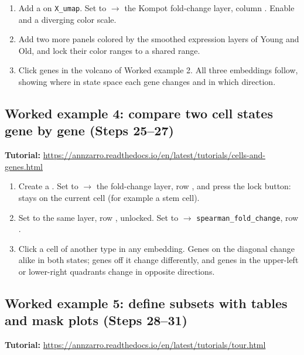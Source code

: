 \begin{enumerate}
\def\labelenumi{\arabic{enumi}.}
\setcounter{enumi}{21}
\tightlist
\item
  Add a  on \texttt{X\_umap}. Set  to  $\rightarrow$ the Kompot fold-change layer, column . Enable  and a diverging color scale.
\troubleshoot{}
\item
  Add two more  panels colored by the smoothed expression layers of Young and Old, and lock their color ranges to a shared range.
\troubleshoot{}
\item
  Click genes in the volcano of Worked example 2. All three embeddings follow, showing where in state space each gene changes and in which direction.
\end{enumerate}

\subsection{Worked example 4: compare two cell states gene by gene (Steps 25--27)}

\noindent\textbf{Tutorial:} \url{https://annzarro.readthedocs.io/en/latest/tutorials/cells-and-genes.html}


\begin{enumerate}
\def\labelenumi{\arabic{enumi}.}
\setcounter{enumi}{24}
\tightlist
\item
  Create a . Set  to  $\rightarrow$ the fold-change layer, row , and press the lock button:  stays on the current cell (for example a stem cell).
\troubleshoot{}
\item
  Set  to the same layer, row , unlocked. Set  to  $\rightarrow$ \texttt{spearman\_fold\_change}, row .
\item
  Click a cell of another type in any embedding. Genes on the diagonal change alike in both states; genes off it change differently, and genes in the upper-left or lower-right quadrants change in opposite directions.
\end{enumerate}

\subsection{Worked example 5: define subsets with tables and mask plots (Steps 28--31)}

\noindent\textbf{Tutorial:} \url{https://annzarro.readthedocs.io/en/latest/tutorials/tour.html}


